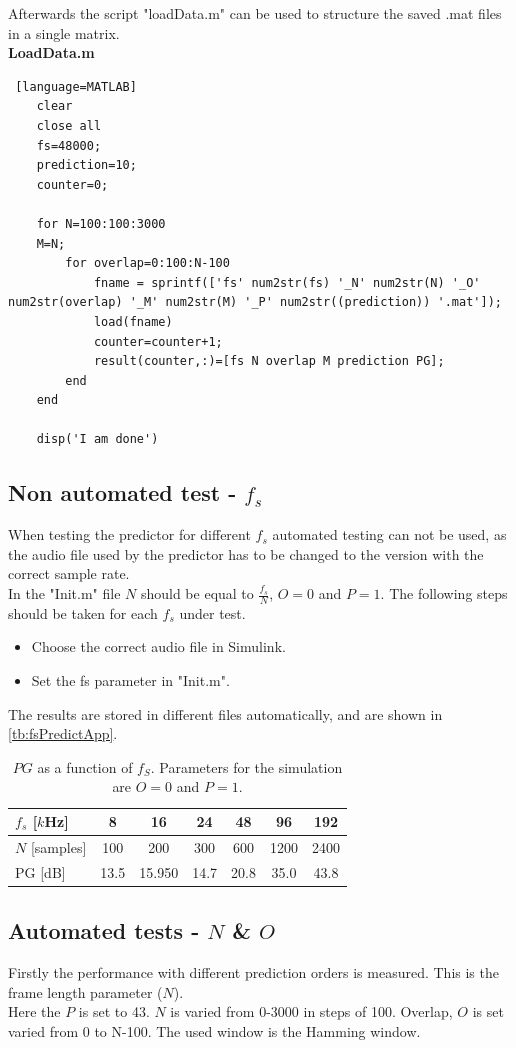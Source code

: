 Afterwards the script "loadData.m" can be used to structure the saved .mat  files in a single matrix.\\
\textbf{LoadData.m}
\begin{lstlisting} [language=MATLAB]
	clear
	close all
	fs=48000;
	prediction=10;
	counter=0;
	
	for N=100:100:3000
	M=N;
		for overlap=0:100:N-100
			fname = sprintf(['fs' num2str(fs) '_N' num2str(N) '_O' num2str(overlap) '_M' num2str(M) '_P' num2str((prediction)) '.mat']);
			load(fname)
			counter=counter+1;
			result(counter,:)=[fs N overlap M prediction PG]; 
		end
	end
	
	disp('I am done')
\end{lstlisting}

\subsection{Non automated test - $f_s$}
When testing the predictor for different $f_s$ automated testing can not be used, as the audio file used by the predictor has to be changed to the version with the correct sample rate. \\ 
In the "Init.m" file $N$ should be equal to $\frac{f_s}{N}$, $O=0$ and $P=1$. The following steps should be taken for each $f_s$ under test.
\begin{itemize}
	\item Choose the correct audio file in Simulink. 
	\item Set the fs parameter in "Init.m". 
\end{itemize}
The results are stored in different files automatically, and are shown in \autoref{tb:fsPredictApp}.

\begin{table}[H]
\centering
\begin{tabular}{|l|c|c|c|c|c|c|}
	\hline
	$f_s$ {[}$k$Hz{]} & 8 & 16 & 24 & 48 & 96 & 192 \\ \hline 
	$N$ {[}samples{]} & 100 & 200 & 300 & 600 & 1200 & 2400 \\ \hline 
	PG {[}dB{]} & 13.5 & 15.950 & 14.7 & 20.8 & 35.0 & 43.8 \\ \hline
\end{tabular}
\caption{$PG$ as a function of $f_S$. Parameters for the simulation are $O=0$ and $P=1$.}
\label{tb:fsPredictApp}
\end{table}  
 
\subsection{Automated tests - $N$ \& $O$}
Firstly the performance with different prediction orders is measured. This is the frame length parameter ($N$). \\ 
Here the $P$ is set to 43. $N$ is varied from 0-3000 in steps of 100. Overlap, $O$ is set varied from 0 to N-100. The used window is the Hamming window. 


